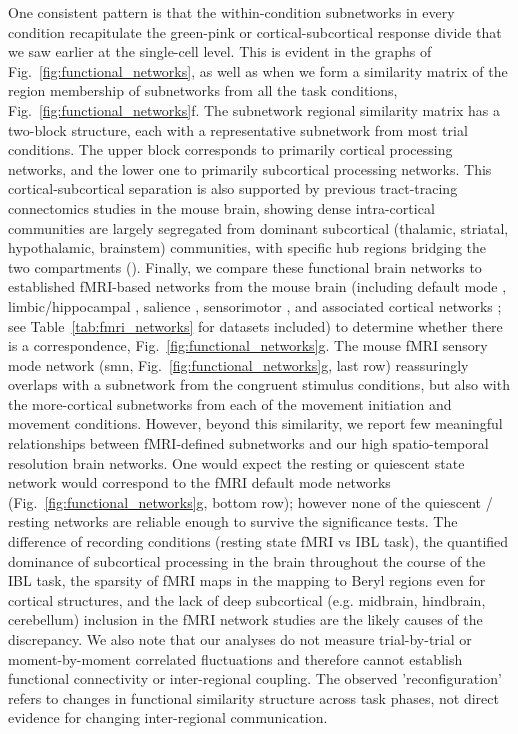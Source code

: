 One consistent pattern is that the within-condition subnetworks in every condition recapitulate the green-pink or cortical-subcortical response divide that we saw earlier at the single-cell level. This is evident in the graphs of Fig.~\ref{fig:functional_networks}, as well as when we form a similarity matrix of the region membership of subnetworks from all the task conditions, Fig.~\ref{fig:functional_networks}f. The subnetwork regional similarity matrix has a two-block structure, each with a representative subnetwork from most trial conditions. The upper block corresponds to primarily cortical processing networks, and the lower one to primarily subcortical processing networks. This cortical-subcortical separation is also supported by previous tract-tracing connectomics studies in the mouse brain, showing dense intra-cortical communities are largely segregated from dominant subcortical (thalamic, striatal, hypothalamic, brainstem) communities, with specific hub regions bridging the two compartments (\cite{Oh2014mesoscale, Ruminov2015wiring}). Finally, we compare these functional brain networks to established fMRI-based networks from the mouse brain (including default mode \cite{whitesell2021regional, fmri_Grandjean2017, fmri_Grandjean2020, fmri_Zerbi2015, fmri_Vafaii2024}, limbic/hippocampal \cite{fmri_Gutierrez-Barragan2022, fmri_Sforazzini2014, fmri_Grandjean2020, fmri_Bukhari2017}, salience \cite{fmri_Tsurugizawa2020, fmri_Grandjean2020, fmri_Vafaii2024}, sensorimotor \cite{fmri_Sforazzini2014, hike2025high, fmri_Zerbi2015, fmri_Grandjean2020}, and associated cortical networks \cite{fmri_Grandjean2017, fmri_Vafaii2024, fmri_Grandjean2020, fmri_Zerbi2015}; see Table~\ref{tab:fmri_networks} for datasets included) to determine whether there is a correspondence, Fig.~\ref{fig:functional_networks}g. The mouse fMRI sensory mode network (smn, Fig.~\ref{fig:functional_networks}g, last row) reassuringly overlaps with a subnetwork from the congruent stimulus conditions, but also with the more-cortical subnetworks from each of the movement initiation and movement conditions. However, beyond this similarity, we report few meaningful relationships between fMRI-defined subnetworks and our high spatio-temporal resolution brain networks. One would expect the resting or quiescent state network would correspond to the fMRI default mode networks (Fig.~\ref{fig:functional_networks}g, bottom row); however none of the quiescent / resting networks are reliable enough to survive the significance tests. The difference of recording conditions (resting state fMRI vs IBL task), the quantified dominance of subcortical processing in the brain throughout the course of the IBL task, the sparsity of fMRI maps in the mapping to Beryl regions even for cortical structures, and the lack of deep subcortical (e.g. midbrain, hindbrain, cerebellum) inclusion in the fMRI network studies are the likely causes of the discrepancy. We also note that our analyses do not measure trial-by-trial or moment-by-moment correlated fluctuations and therefore cannot establish functional connectivity or inter-regional coupling. The observed 'reconfiguration' refers to changes in functional similarity structure across task phases, not direct evidence for changing inter-regional communication.

